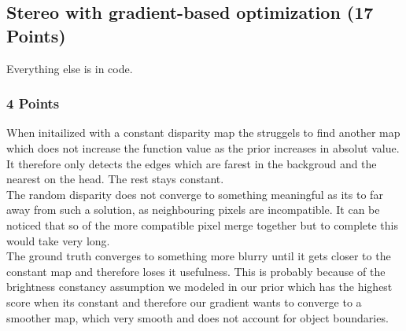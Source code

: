 \newif\ifvimbug
\vimbugfalse

\ifvimbug

\fi


\subsection{Stereo with gradient-based optimization (17 Points)}
Everything else is in code.
\subsubsection{4 Points}
When initailized with a constant disparity map the struggels to find another map which does not increase the function value as the prior increases in absolut value. It therefore only detects the edges which are farest in the backgroud and the nearest on the head. The rest stays constant.\\
The random disparity does not converge to something meaningful as its to far away from such a solution, as neighbouring pixels are incompatible. It can be noticed that so of the more compatible pixel merge together but to complete this would take very long.\\
The ground truth converges to something more blurry until it gets closer to the constant map and therefore loses it usefulness. This is probably because of the brightness constancy assumption we modeled in our prior which has the highest score when its constant and therefore our gradient wants to converge to a smoother map, which very smooth and does not account for object boundaries.\\

